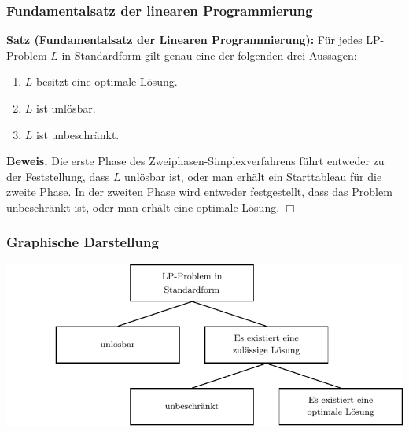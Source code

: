 \documentclass[smaller]{beamer}
\begin{document}
\begin{frame}
 \frametitle{Fundamentalsatz der linearen Programmierung}
 \textbf{Satz (Fundamentalsatz der Linearen Programmierung):}
Für jedes LP-Problem $L$ in Standardform gilt genau eine der folgenden drei Aussagen:
\begin{enumerate}[1)]
\item $L$ besitzt eine optimale Lösung.
\item $L$ ist unlösbar.
\item $L$ ist unbeschränkt.
\end{enumerate}

\textbf{Beweis.} Die erste Phase des Zweiphasen-Simplexverfahrens führt entweder zu der Feststellung, dass $L$ unlösbar ist, oder man erhält ein Starttableau für die zweite Phase. In der zweiten Phase wird entweder festgestellt, dass das Problem unbeschränkt ist, oder man erhält eine optimale Lösung. \hfill $\Box$
\end{frame}

\begin{frame}
 \frametitle{Graphische Darstellung}
 \begin{center}
 \hspace*{-1.5cm}\includegraphics{fig5.pdf}
 \end{center}
\end{frame}
\end{document}

